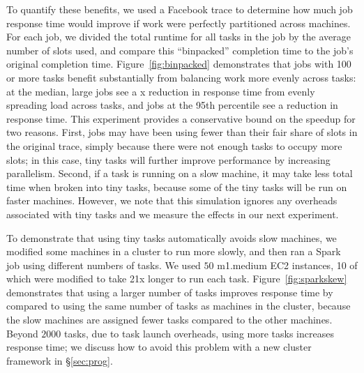 To quantify these benefits, we used a Facebook trace to determine how much
job response time would improve if work were perfectly partitioned across
machines. For each job, we divided the total runtime for all tasks in the
job by the average number of slots used, and compare this ``binpacked''
completion time to the job's original completion time.
Figure~\ref{fig:binpacked}
demonstrates that jobs with 100 or more tasks benefit substantially from
balancing work more evenly across tasks: at the median, large jobs see
a x reduction in response time from evenly spreading load
across tasks, and
jobs at the 95th percentile see a  reduction in response time.
This experiment provides a conservative bound on the speedup for two reasons. First, jobs
may have been using fewer than their fair share of slots in the original trace,
simply because there were not enough tasks to occupy more slots; in this case,
tiny tasks will further improve performance by increasing parallelism. Second,
if a task is running on a slow machine, it may take less total time when
broken into tiny tasks, because some of the tiny tasks will be run on faster
machines. However, we note that this simulation ignores any overheads associated with 
tiny tasks and we measure the effects in our next experiment.



To demonstrate that using tiny tasks automatically avoids slow machines,
we modified some machines in a cluster to run more slowly, and then
ran a Spark~\cite{zaharia2010spark} job using different numbers of tasks. 
We used $50$ m1.medium EC2
instances, 10 of which were modified to take 21x longer to run each task.
Figure~\ref{fig:sparkskew} demonstrates that using a larger number of tasks
improves response time by  compared to using the same number
of tasks as machines in the cluster, because the slow machines are
assigned fewer tasks
compared to the other machines. Beyond $2000$ tasks, due to
task launch overheads, using more tasks increases response time; we discuss
how to avoid this problem with a new cluster framework in \S\ref{sec:prog}.


